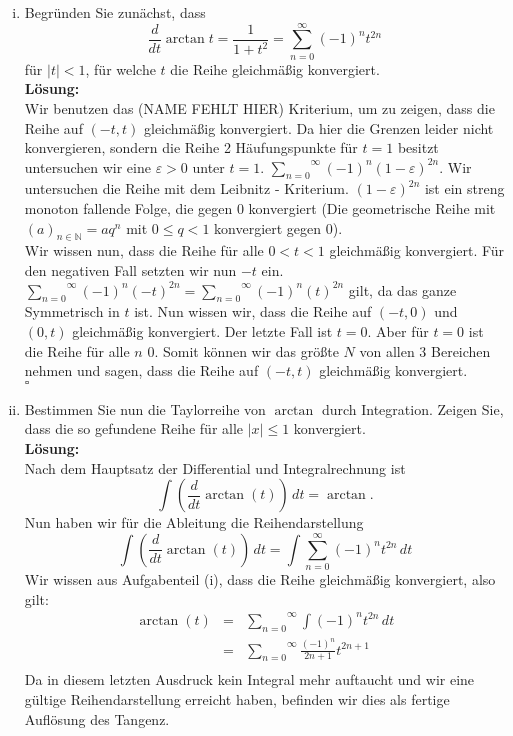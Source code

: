 \documentclass[11pt,a4paper,ngerman]{article}
\begin{document}
\begin{enumerate}[(i)]
    \item Begründen Sie zunächst, dass
        $$
            \frac{d}{dt} \arctan t = \frac{1}{1 + t^2} = \overset{\infty}{\underset{n=0}{\sum}} (-1)^nt^{2n}
        $$
        für $|t|<1$, für welche $t$ die Reihe gleichmäßig konvergiert.\\
    \textbf{Lösung:}\\
        Wir benutzen das (NAME FEHLT HIER) Kriterium, um zu zeigen, dass die Reihe auf $(-t,t)$ gleichmäßig
        konvergiert. Da hier die Grenzen leider nicht konvergieren, sondern die Reihe 2 Häufungspunkte
        für $t=1$ besitzt untersuchen wir eine $\varepsilon>0$ unter $t=1$.
        $\overset{\infty}{\underset{n=0}{\sum}} (-1)^n(1-\varepsilon)^{2n}$. Wir untersuchen die Reihe
        mit dem Leibnitz - Kriterium. $(1-\varepsilon)^{2n}$ ist ein streng monoton fallende Folge, die
        gegen 0 konvergiert (Die geometrische Reihe mit $(a)_{n\in\mathbb{N}} = aq^n$ mit $0\leq q < 1$
        konvergiert gegen 0).\\
        Wir wissen nun, dass die Reihe für alle $0<t<1$ gleichmäßig konvergiert. Für den negativen Fall
        setzten wir nun $-t$ ein. $\overset{\infty}{\underset{n=0}{\sum}} (-1)^n(-t)^{2n} =
        \overset{\infty}{\underset{n=0}{\sum}} (-1)^n(t)^{2n}$ gilt, da das ganze Symmetrisch in $t$ ist.
        Nun wissen wir, dass die Reihe auf $(-t,0)$ und $(0,t)$ gleichmäßig konvergiert.
        Der letzte Fall ist $t=0$. Aber für $t=0$ ist die Reihe für alle $n$ 0. Somit können wir
        das größte $N$ von allen 3 Bereichen nehmen und sagen, dass die Reihe auf $(-t,t)$ gleichmäßig
        konvergiert.\\
        \mbox{} \hfill $\square$

    \item Bestimmen Sie nun die Taylorreihe von $\arctan$ durch Integration. Zeigen Sie, dass die so
        gefundene Reihe für alle $|x|\leq 1$ konvergiert.\\
    \textbf{Lösung:}\\
        Nach dem Hauptsatz der Differential und Integralrechnung ist
        $$
            \int (\frac{d}{dt} \arctan (t) ) \, dt = \arctan.
        $$
        Nun haben wir für die Ableitung die Reihendarstellung
        $$
            \int (\frac{d}{dt} \arctan (t) ) \, dt 
                = \int \overset{\infty}{\underset{n=0}{\sum}} (-1)^nt^{2n} \, dt
        $$
        Wir wissen aus Aufgabenteil (i), dass die Reihe gleichmäßig konvergiert, also gilt:
        $$\begin{array}{rcl}
            \arctan (t) &=& \overset{\infty}{\underset{n=0}{\sum}} \int (-1)^nt^{2n} \, dt\\
                &=& \overset{\infty}{\underset{n=0}{\sum}} \frac{(-1)^n}{2n+1}t^{2n+1} \\
        \end{array}$$
        Da in diesem letzten Ausdruck kein Integral mehr auftaucht und wir eine gültige
        Reihendarstellung erreicht haben, befinden wir dies als fertige Auflösung des Tangenz.\\
        

\end{enumerate}
\end{document}
